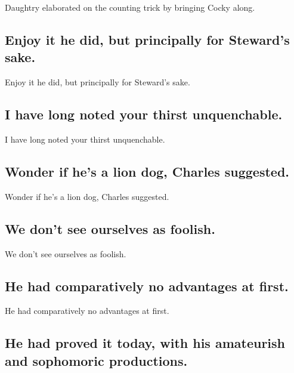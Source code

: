 \documentclass[]{article}
\begin{document}
Daughtry elaborated on the counting trick by bringing Cocky along.

\hypertarget{enjoy-it-he-did-but-principally-for-stewards-sake.}{%
\subsection{Enjoy it he did, but principally for Steward's
sake.}\label{enjoy-it-he-did-but-principally-for-stewards-sake.}}

Enjoy it he did, but principally for Steward's sake.

\hypertarget{i-have-long-noted-your-thirst-unquenchable.}{%
\subsection{I have long noted your thirst
unquenchable.}\label{i-have-long-noted-your-thirst-unquenchable.}}

I have long noted your thirst unquenchable.

\hypertarget{wonder-if-hes-a-lion-dog-charles-suggested.}{%
\subsection{Wonder if he's a lion dog, Charles
suggested.}\label{wonder-if-hes-a-lion-dog-charles-suggested.}}

Wonder if he's a lion dog, Charles suggested.

\hypertarget{we-dont-see-ourselves-as-foolish.}{%
\subsection{We don't see ourselves as
foolish.}\label{we-dont-see-ourselves-as-foolish.}}

We don't see ourselves as foolish.

\hypertarget{he-had-comparatively-no-advantages-at-first.}{%
\subsection{He had comparatively no advantages at
first.}\label{he-had-comparatively-no-advantages-at-first.}}

He had comparatively no advantages at first.

\hypertarget{he-had-proved-it-today-with-his-amateurish-and-sophomoric-productions.}{%
\subsection{He had proved it today, with his amateurish and sophomoric
productions.}\label{he-had-proved-it-today-with-his-amateurish-and-sophomoric-productions.}}
\end{document}
